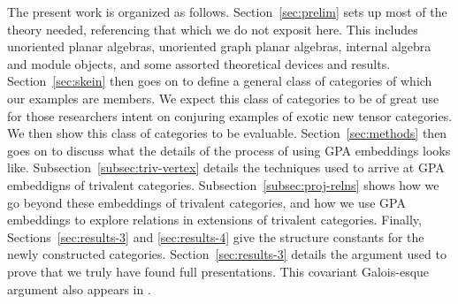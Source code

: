 
The present work is organized as follows.
Section~\ref{sec:prelim} sets up most of the theory needed, referencing that which we do not exposit here.
This includes unoriented planar algebras, unoriented graph planar algebras, 
internal algebra and module objects, and some assorted theoretical devices and results.
Section~\ref{sec:skein} then goes on to define a general class of categories of which our examples are members.
We expect this class of categories to be of great use for those researchers intent on conjuring 
examples of exotic new tensor categories.
We then show this class of categories to be evaluable.
Section~\ref{sec:methods} then goes on to discuss what the details of the process of using GPA 
embeddings looks like.
Subsection~\ref{subsec:triv-vertex} details the techniques used to arrive at GPA embeddigns of 
trivalent categories. 
Subsection~\ref{subsec:proj-relns} shows how we go beyond these embeddings of trivalent categories,
and how we use GPA embeddings to explore relations in extensions of trivalent categories.
Finally, Sections~\ref{sec:results-3} and \ref{sec:results-4} give the structure constants for the 
newly constructed categories.
Section~\ref{sec:results-3} details the argument used to prove that we truly have found full presentations.
This covariant Galois-esque argument also appears in \cite{cain_noah_hans}.